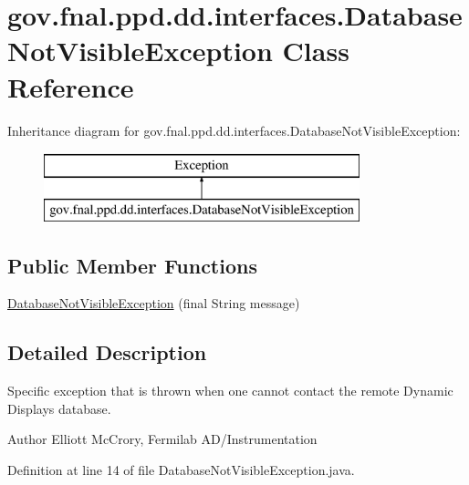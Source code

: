 \hypertarget{classgov_1_1fnal_1_1ppd_1_1dd_1_1interfaces_1_1DatabaseNotVisibleException}{\section{gov.\-fnal.\-ppd.\-dd.\-interfaces.\-Database\-Not\-Visible\-Exception Class Reference}
\label{classgov_1_1fnal_1_1ppd_1_1dd_1_1interfaces_1_1DatabaseNotVisibleException}
}
Inheritance diagram for gov.\-fnal.\-ppd.\-dd.\-interfaces.\-Database\-Not\-Visible\-Exception\-:\begin{figure}[H]
\begin{center}
\leavevmode
\includegraphics[height=2.000000cm]{classgov_1_1fnal_1_1ppd_1_1dd_1_1interfaces_1_1DatabaseNotVisibleException}
\end{center}
\end{figure}
\subsection*{Public Member Functions}
\begin{DoxyCompactItemize}
\item 
\hyperlink{classgov_1_1fnal_1_1ppd_1_1dd_1_1interfaces_1_1DatabaseNotVisibleException_a2f8be9e5eadc05bcbb8531a042933fec}{Database\-Not\-Visible\-Exception} (final String message)
\end{DoxyCompactItemize}


\subsection{Detailed Description}
Specific exception that is thrown when one cannot contact the remote Dynamic Displays database.

\begin{DoxyAuthor}{Author}
Elliott Mc\-Crory, Fermilab A\-D/\-Instrumentation 
\end{DoxyAuthor}


Definition at line 14 of file Database\-Not\-Visible\-Exception.\-java.



